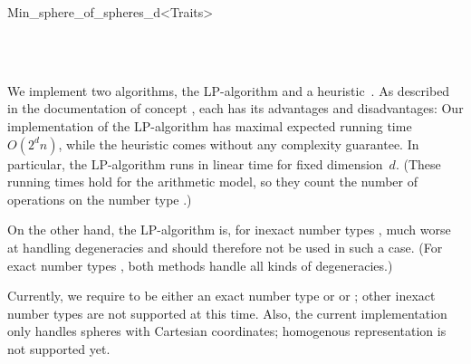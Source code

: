 \begin{ccRefClass}{Min_sphere_of_spheres_d<Traits>}
%
%
%
%

\ccSeeAlso
%
    \\
    \\

\ccImplementation
\ccIndexImplementation

We implement two algorithms, the LP-algorithm and a
heuristic~\cite{msw-sblp-92}.  As described in the documentation of
concept , each has its advantages and
disadvantages: Our implementation of the LP-algorithm has maximal
expected running time $O(2^d n)$, while the heuristic comes without
any complexity guarantee.  In particular, the LP-algorithm runs in
linear time for fixed dimension~$d$. (These running times hold for the
arithmetic model, so they count the number of operations on
the number type .)

On the other hand, the LP-algorithm is, for inexact number types
, much worse at handling degeneracies and should therefore not
be used in such a case.  (For exact number types
, both methods handle all kinds of degeneracies.)

Currently, we require  to be either an exact number
type or  or ; other inexact number types are
not supported at this time.  Also, the current implementation only
handles spheres with Cartesian coordinates; homogenous representation
is not supported yet.

\ccExample
{}

\end{ccRefClass}


